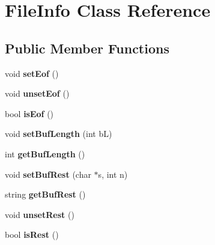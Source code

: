 \hypertarget{class_file_info}{\section{File\-Info Class Reference}
\label{class_file_info}
}
\subsection*{Public Member Functions}
\begin{DoxyCompactItemize}
\item 
\hypertarget{class_file_info_a6253f99d5ab493bf38abc4bdebd7c562}{void {\bfseries set\-Eof} ()}\label{class_file_info_a6253f99d5ab493bf38abc4bdebd7c562}

\item 
\hypertarget{class_file_info_acc744e2d853317a33b59510d606b5bb7}{void {\bfseries unset\-Eof} ()}\label{class_file_info_acc744e2d853317a33b59510d606b5bb7}

\item 
\hypertarget{class_file_info_a2850dc22cb478492f49ca3104589c847}{bool {\bfseries is\-Eof} ()}\label{class_file_info_a2850dc22cb478492f49ca3104589c847}

\item 
\hypertarget{class_file_info_a5c69779466ec42a73d9d8d9a7d717215}{void {\bfseries set\-Buf\-Length} (int b\-L)}\label{class_file_info_a5c69779466ec42a73d9d8d9a7d717215}

\item 
\hypertarget{class_file_info_abebe32508e8ddf2cf0523acc2aa02bb6}{int {\bfseries get\-Buf\-Length} ()}\label{class_file_info_abebe32508e8ddf2cf0523acc2aa02bb6}

\item 
\hypertarget{class_file_info_a27a48cf6b61ba28308b23107a3876c61}{void {\bfseries set\-Buf\-Rest} (char $\ast$s, int n)}\label{class_file_info_a27a48cf6b61ba28308b23107a3876c61}

\item 
\hypertarget{class_file_info_a3b5b9907ecc2d39a1ea3476d4cbac544}{string {\bfseries get\-Buf\-Rest} ()}\label{class_file_info_a3b5b9907ecc2d39a1ea3476d4cbac544}

\item 
\hypertarget{class_file_info_a07b19d9604e1570ed16d491184adacfb}{void {\bfseries unset\-Rest} ()}\label{class_file_info_a07b19d9604e1570ed16d491184adacfb}

\item 
\hypertarget{class_file_info_a69a6057704a16be2184f475c0a67fb9d}{bool {\bfseries is\-Rest} ()}\label{class_file_info_a69a6057704a16be2184f475c0a67fb9d}


\end{DoxyCompactItemize}
